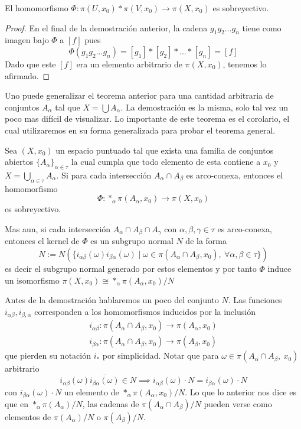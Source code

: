 \begin{corolario}\label{cor:sobre-van}
  El homomorfismo \(\Phi : \pi (U, x_0) * \pi (V, x_0) \to \pi (X,
  x_0)\) es sobreyectivo.
\end{corolario}
\begin{proof}
  En el final de la demostración anterior, la cadena \(g_1 g_2 \dots
  g_n\) tiene como imagen bajo \(\Phi\) a \([f]\) pues
  \[ \Phi \left( g_1 g_2 ... g_n \right) = [g_1] * [g_2] * ... *
    [g_n] = [f] \]
  Dado que este \([f]\) era un elemento arbitrario de \(\pi \left( X,
    x_0 \right)\), tenemos lo afirmado.
\end{proof}
Uno puede generalizar el teorema anterior para una cantidad arbitraria
de conjuntos \(A_\alpha\) tal que \(X = \bigcup A_\alpha\). La
demostración es la misma, solo tal vez un poco mas difícil de
visualizar. Lo importante de este teorema es el corolario, el cual
utilizaremos en su forma generalizada para probar el teorema general.

\begin{teorema}[\vank]
  Sea \((X, x_0)\) un espacio puntuado tal que exista una familia de
  conjuntos abiertos \(\{A_\alpha\}_{\alpha \in \tau}\) la cual cumpla
  que todo elemento de esta contiene a \(x_0\) y \( X = \bigcup_{\alpha
  \in \tau} A_\alpha\). Si para cada intersección \(A_\alpha \cap
  A_\beta\) es arco-conexa, entonces el homomorfismo
  \[ \Phi : *_\alpha \pi (A_\alpha, x_0) \to \pi (X, x_0) \]
  es sobreyectivo.

  Mas aun, si cada intersección \(A_\alpha \cap A_\beta
  \cap A_\gamma\) con \( \alpha, \beta, \gamma \in \tau\) es arco-conexa,
  entonces el kernel de \(\Phi\) es un subgrupo normal \(N\) de la forma
  \[
    N := N \left( \{ i_{\alpha \beta} (\omega) \overline{i_{\beta
    \alpha} (\omega)} \mid \omega \in \pi \left( A_\alpha \cap A_\beta, x_0
    \right),\ \forall \alpha ,\beta \in \tau \} \right)
  \]
  es decir el subgrupo normal generado por estos elementos y por tanto
  \(\Phi\) induce un isomorfismo \(\pi (X, x_0) \cong *_\alpha \pi
  (A_\alpha, x_0) / N \)
\end{teorema}
Antes de la demostración hablaremos un poco del conjunto \(N\). Las
funciones \(i_{\alpha \beta}, i_{\beta, \alpha}\) corresponden a los
homomorfismos inducidos por la inclusión
\begin{gather*}
  i_{\alpha \beta} : \pi (A_\alpha \cap A_\beta , x_0 ) \longrightarrow \pi (A_\alpha, x_0) \\
  i_{\beta \alpha} : \pi (A_\alpha \cap A_\beta , x_0 ) \longrightarrow \pi (A_\beta, x_0)
\end{gather*}
que pierden su notación \(i_*\) por simplicidad. Notar que
para \(\omega \in \pi (A_\alpha \cap A_\beta ,\ x_0)\) arbitrario
\[ i_{\alpha \beta} (\omega) \overline{i_{\beta \alpha} (\omega)} \in N
  \implies i_{\alpha \beta} (\omega) \cdot N = i_{\beta
\alpha} (\omega) \cdot N \]
con \(i_{\beta \alpha} (\omega) \cdot N\) un elemento de \(*_\alpha \pi
(A_\alpha , x_0) / N\). Lo que lo anterior nos dice es que en \(*_\alpha
\pi (A_\alpha) / N\), las cadenas de \(\pi (A_\alpha \cap A_\beta) / N\)
pueden verse como elementos de \(\pi(A_\alpha) / N\) o \(\pi (A_\beta) /
N\).

